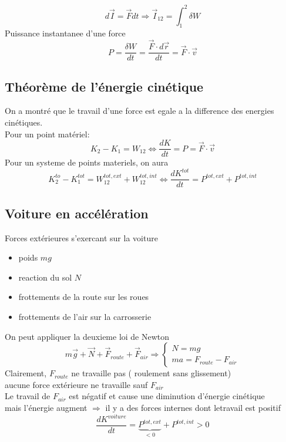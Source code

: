 \documentclass[../main.tex]{subfiles}
\begin{document}
\[ 
	d \vec{I} = \vec{F} dt \Rightarrow \vec{I}_{12} = \int_{ 1 }^{ 2 }\delta W
\]
Puissance instantanee d'une force
\[ 
P= \frac{\delta W}{dt} = \frac{\vec{F} \cdot d \vec{r}}{dt}= \vec{F} \cdot \vec{v}
\]
\subsection{Théorème de l'énergie cinétique}
On a montré que le travail d'une force est egale a la difference des energies cinétiques.\\
Pour un point matériel:
\[ 
K_2 - K_1 = W_{12} \iff \frac{dK}{dt}=P = \vec{F} \cdot \vec{v}
\]
Pour un systeme de points materiels, on aura
\[ 
K^{to}_2 - K^{tot}_1 = W^{tot,ext}_{12} + W^{tot,int} _{12}  \iff \frac{d K^{tot}}{dt} = P^{tot,ext} + P^{tot,int}
\]
\subsection{Voiture en accélération}
Forces extérieures s'exercant sur la voiture
\begin{itemize}
\item poids $mg$ 
\item reaction du sol $N$ 
\item frottements de la route sur les roues
\item frottements de l'air sur la carrosserie
\end{itemize}
On peut appliquer la deuxieme loi de Newton
\[ 
m \vec{g} + \vec{N} + \vec{F}_{route} + \vec{F}_{air} \Rightarrow 
\begin{cases}
N= mg\\
ma = F_{route} - F_{air} 
\end{cases}
\]
Clairement, $F_{route} $ ne travaille pas ( roulement sans glissement)\\
aucune force extérieure ne travaille  sauf $F_{air} $ \\
Le travail de $F_{air} $ est négatif et cause une diminution d'énergie cinétique\\
mais l'énergie augment
$\Rightarrow$ il y a des forces internes dont letravail est positif
\[ 
\frac{d K ^{voiture}}{dt}= \underbrace{P^{tot,ext}}_{<0} + P^{tot,int } >0
\]
\end{document}
